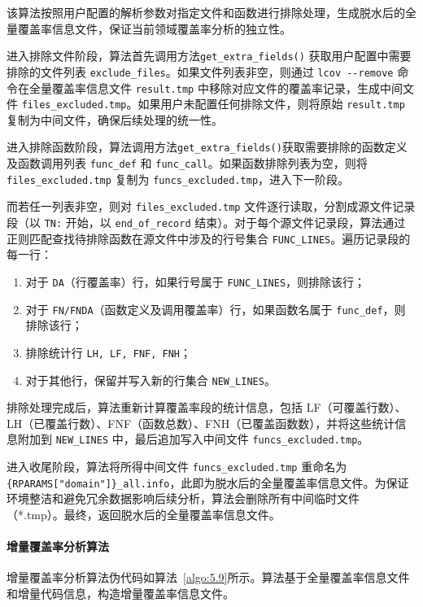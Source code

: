 该算法按照用户配置的解析参数对指定文件和函数进行排除处理，生成脱水后的全量覆盖率信息文件，保证当前领域覆盖率分析的独立性。

进入排除文件阶段，算法首先调用方法\verb|get_extra_fields()| 获取用户配置中需要排除的文件列表 \verb|exclude_files|。如果文件列表非空，则通过 \verb|lcov --remove| 命令在全量覆盖率信息文件 \verb|result.tmp| 中移除对应文件的覆盖率记录，生成中间文件 \verb|files_excluded.tmp|。如果用户未配置任何排除文件，则将原始 \verb|result.tmp| 复制为中间文件，确保后续处理的统一性。

进入排除函数阶段，算法调用方法\verb|get_extra_fields()|获取需要排除的函数定义及函数调用列表 \verb|func_def| 和 \verb|func_call|。如果函数排除列表为空，则将 \verb|files_excluded.tmp| 复制为 \verb|funcs_excluded.tmp|，进入下一阶段。

而若任一列表非空，则对 \verb|files_excluded.tmp| 文件逐行读取，分割成源文件记录段（以 \verb|TN:| 开始，以 \verb|end_of_record| 结束）。对于每个源文件记录段，算法通过正则匹配查找待排除函数在源文件中涉及的行号集合 \verb|FUNC_LINES|。遍历记录段的每一行：

\begin{enumerate}
    \item 对于 \verb|DA|（行覆盖率）行，如果行号属于 \verb|FUNC_LINES|，则排除该行；
    \item 对于 \verb|FN/FNDA|（函数定义及调用覆盖率）行，如果函数名属于 \verb|func_def|，则排除该行；
    \item 排除统计行 \verb|LH, LF, FNF, FNH|；
    \item 对于其他行，保留并写入新的行集合 \verb|NEW_LINES|。
\end{enumerate}

排除处理完成后，算法重新计算覆盖率段的统计信息，包括 LF（可覆盖行数）、LH（已覆盖行数）、FNF（函数总数）、FNH（已覆盖函数数），并将这些统计信息附加到 \verb|NEW_LINES| 中，最后追加写入中间文件 \verb|funcs_excluded.tmp|。

进入收尾阶段，算法将所得中间文件 \verb|funcs_excluded.tmp| 重命名为 \verb|{RPARAMS["domain"]}_all.info|，此即为脱水后的全量覆盖率信息文件。为保证环境整洁和避免冗余数据影响后续分析，算法会删除所有中间临时文件（*.tmp）。最终，返回脱水后的全量覆盖率信息文件。

\paragraph{\textbf{增量覆盖率分析算法}}
增量覆盖率分析算法伪代码如算法~\ref{algo:5.9}所示。算法基于全量覆盖率信息文件和增量代码信息，构造增量覆盖率信息文件。


